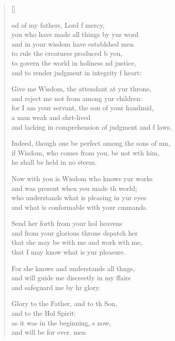 \settowidth{\versewidth}{Indeed, though one be perfect among the sons of men, +}
\begin{verse}[\versewidth]
  \begin{patverse}
od of my fathers, Lord f mercy,\Med\\
you who have made all things by yur word\\
and in your wisdom have establ\pointup{\i}shed men\Med\\
to rule the creatures produced b you,\\
to govern the world in holiness nd justice,\Med\\
and to render judgment in integrity f heart:

Give me Wisdom, the attendant at yur throne,\Med\\
and reject me not from among yur children:\\
for I am your servant, the son of your handmid,\Flex\\
a man weak and shrt-lived\Med\\
and lacking in comprehension of judgment and f laws.

Indeed, though one be perfect among the sons of mn,\Flex\\
if Wisdom, who comes from you, be not w\pointup{\i}th him,\Med\\
he shall be held in no steem.

Now with you is Wisdom who knows yur works\Med\\
and was present when you made th world;\\
who understands what is pleasing in yur eyes\Med\\
and what is conformable with your cmmands.

Send her forth from your hol heavens\Med\\
and from your glorious throne d\pointup{\i}spatch her\\
that she may be with me and work w\pointup{\i}th me,\Med\\
that I may know what is yur pleasure.

For she knows and understands all th\pointup{\i}ngs,\Flex\\
and will guide me discreetly in my ffairs\Med\\
and safeguard me by hr glory.

Glory to the Father, and to th Son,\Med\\
and to the Hol Spirit:\\
as it was in the beginning, \pointup{\i}s now,\Med\\
and will be for ever. men
  \end{patverse}
\end{verse}
